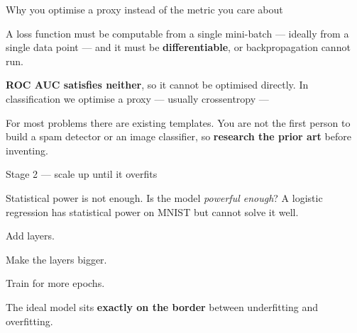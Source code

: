 \documentclass[aspectratio=169,11pt,t]{beamer}
\begin{document}
\begin{frame}[shrink=25]{Why you optimise a proxy instead of the metric you care about}
{\fontsize{9.4}{12.6}\selectfont\color{fg2}A loss function must be computable from a single mini-batch --- ideally from a single data point --- and it must be \textbf{differentiable}, or backpropagation cannot run.\par}\vskip 4pt
\begin{iband}[signal]
\textbf{ROC AUC satisfies neither}, so it cannot be optimised directly. In classification we optimise a proxy --- usually crossentropy --- 
\end{iband}
{\fontsize{9.4}{12.6}\selectfont\color{fg2}For most problems there are existing templates. You are not the first person to build a spam detector or an image classifier, so \textbf{research the prior art} before inventing.\par}\vskip 4pt
\end{frame}

\begin{frame}[shrink=25]{Stage 2 --- scale up until it overfits}
{\fontsize{9.4}{12.6}\selectfont\color{fg2}Statistical power is not enough. Is the model \textit{powerful enough}? A logistic regression has statistical power on MNIST but cannot solve it well.\par}\vskip 4pt
\begin{ibullets}
\item Add layers.
\item Make the layers bigger.
\item Train for more epochs.
\end{ibullets}
\begin{iband}[signal]
The ideal model sits \textbf{exactly on the border} between underfitting and overfitting. 
\end{iband}
\end{frame}
\end{document}
